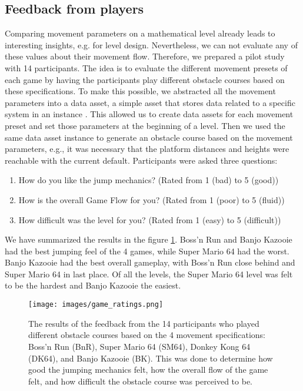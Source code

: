 \documentclass[letterpaper, 10 pt, conference]{ieeeconf}  %
\begin{document}
\subsection{Feedback from players}

Comparing movement parameters on a mathematical level already leads to interesting insights, e.g. for level design.
Nevertheless, we can not evaluate any of these values about their movement flow.
Therefore, we prepared a pilot study with 14 participants.
The idea is to evaluate the different movement presets of each game by having the participants play different obstacle courses based on these specifications.
To make this possible, we abstracted all the movement parameters into a data asset, a simple asset that stores data related to a specific system in an instance \cite{dataAsset}.
This allowed us to create data assets for each movement preset and set those parameters at the beginning of a level.
Then we used the same data asset instance to generate an obstacle course based on the movement parameters, e.g., it was necessary that the platform distances and heights were reachable with the current default.
Participants were asked three questions:

\begin{enumerate}
    \item How do you like the jump mechanics? (Rated from 1 (bad) to 5 (good))
    \item How is the overall Game Flow for you? (Rated from 1 (poor) to 5 (fluid))
    \item How difficult was the level for you? (Rated from 1 (easy) to 5 (difficult))
\end{enumerate}

We have summarized the results in the figure \ref{fig:eval}.
Boss'n Run and Banjo Kazooie had the best jumping feel of the 4 games, while Super Mario 64 had the worst.
Banjo Kazooie had the best overall gameplay, with Boss'n Run close behind and Super Mario 64 in last place.
Of all the levels, the Super Mario 64 level was felt to be the hardest and Banjo Kazooie the easiest.

\begin{figure}[!ht]
    \caption{ The results of the feedback from the 14 participants who played different obstacle courses based on the 4 movement specifications: Boss'n Run (BnR), Super Mario 64 (SM64), Donkey Kong 64 (DK64), and Banjo Kazooie (BK).
    This was done to determine how good the jumping mechanics felt, how the overall flow of the game felt, and how difficult the obstacle course was perceived to be. 
    }
    \centering
    \texttt{[image: images/game\_ratings.png]}
    \label{fig:eval}
\end{figure}
\end{document}
